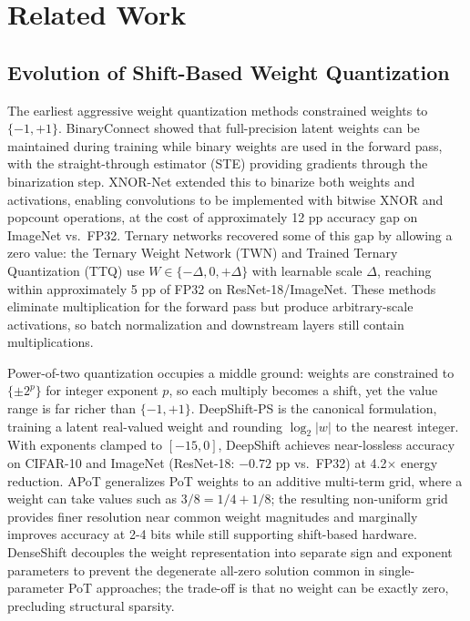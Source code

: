 \documentclass[12pt]{article}
\begin{document}
\section{Related Work}
\label{sec:related}

\subsection{Evolution of Shift-Based Weight Quantization}

The earliest aggressive weight quantization methods constrained weights to $\{-1, +1\}$. BinaryConnect \cite{courbariaux2015binaryconnect} showed that full-precision latent weights can be maintained during training while binary weights are used in the forward pass, with the straight-through estimator (STE) \cite{bengio2013ste} providing gradients through the binarization step. XNOR-Net \cite{rastegari2016xnor} extended this to binarize both weights and activations, enabling convolutions to be implemented with bitwise XNOR and popcount operations, at the cost of approximately 12 pp accuracy gap on ImageNet vs.\ FP32. Ternary networks recovered some of this gap by allowing a zero value: the Ternary Weight Network (TWN) \cite{li2016twn} and Trained Ternary Quantization (TTQ) \cite{zhu2016ttq} use $W \in \{-\Delta, 0, +\Delta\}$ with learnable scale $\Delta$, reaching within approximately 5 pp of FP32 on ResNet-18/ImageNet. These methods eliminate multiplication for the forward pass but produce arbitrary-scale activations, so batch normalization and downstream layers still contain multiplications.

Power-of-two quantization occupies a middle ground: weights are constrained to $\{\pm 2^p\}$ for integer exponent $p$, so each multiply becomes a shift, yet the value range is far richer than $\{-1,+1\}$. DeepShift-PS \cite{elhoushi2021deepshift} is the canonical formulation, training a latent real-valued weight and rounding $\log_2|w|$ to the nearest integer. With exponents clamped to $[-15, 0]$, DeepShift achieves near-lossless accuracy on CIFAR-10 and ImageNet (ResNet-18: $-0.72$ pp vs.\ FP32) at 4.2$\times$ energy reduction. APoT \cite{li2020apot} generalizes PoT weights to an additive multi-term grid, where a weight can take values such as $3/8 = 1/4 + 1/8$; the resulting non-uniform grid provides finer resolution near common weight magnitudes and marginally improves accuracy at 2-4 bits while still supporting shift-based hardware. DenseShift \cite{li2023denseshift} decouples the weight representation into separate sign and exponent parameters to prevent the degenerate all-zero solution common in single-parameter PoT approaches; the trade-off is that no weight can be exactly zero, precluding structural sparsity.
\end{document}
